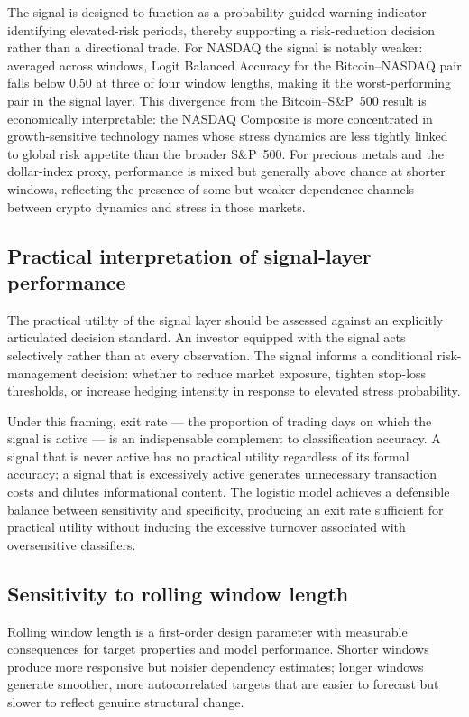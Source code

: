 The signal is designed to function as a probability-guided warning indicator identifying elevated-risk periods, thereby supporting a risk-reduction decision rather than a directional trade. For NASDAQ the signal is notably weaker: averaged across windows, Logit Balanced Accuracy for the Bitcoin--NASDAQ pair falls below 0.50 at three of four window lengths, making it the worst-performing pair in the signal layer. This divergence from the Bitcoin--S\&P~500 result is economically interpretable: the NASDAQ Composite is more concentrated in growth-sensitive technology names whose stress dynamics are less tightly linked to global risk appetite than the broader S\&P~500. For precious metals and the dollar-index proxy, performance is mixed but generally above chance at shorter windows, reflecting the presence of some but weaker dependence channels between crypto dynamics and stress in those markets.

\subsection{Practical interpretation of signal-layer performance}

The practical utility of the signal layer should be assessed against an explicitly articulated decision standard. An investor equipped with the signal acts selectively rather than at every observation. The signal informs a conditional risk-management decision: whether to reduce market exposure, tighten stop-loss thresholds, or increase hedging intensity in response to elevated stress probability.

Under this framing, exit rate --- the proportion of trading days on which the signal is active --- is an indispensable complement to classification accuracy. A signal that is never active has no practical utility regardless of its formal accuracy; a signal that is excessively active generates unnecessary transaction costs and dilutes informational content. The logistic model achieves a defensible balance between sensitivity and specificity, producing an exit rate sufficient for practical utility without inducing the excessive turnover associated with oversensitive classifiers.

\subsection{Sensitivity to rolling window length}

Rolling window length is a first-order design parameter with measurable consequences for target properties and model performance. Shorter windows produce more responsive but noisier dependency estimates; longer windows generate smoother, more autocorrelated targets that are easier to forecast but slower to reflect genuine structural change.

